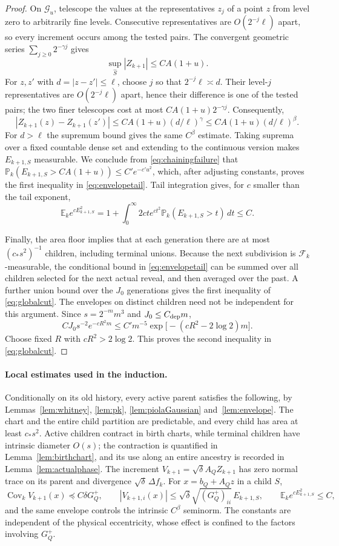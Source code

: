\documentclass[11pt]{article}
\theoremstyle{definition}
\theoremstyle{remark}
\numberwithin{equation}{section}
\newcommand{\E}{\mathbb E}
\newcommand{\Pp}{\mathbb P}
\newcommand{\F}{\mathcal F}
\begin{document}
\begin{proof}
On $\mathcal G_u$, telescope the values at the
representatives $z_j$ of a point $z$ from level zero to
arbitrarily fine levels. Consecutive representatives are
$O(2^{-j}\ell)$ apart, so every increment occurs among the
tested pairs. The convergent geometric series
$\sum_{j\ge0}2^{-\gamma j}$ gives
\[
 \sup_{\widehat S}|Z_{k+1}|\le C A(1+u).
\]
For $z,z'$ with $d=|z-z'|\le\ell$, choose $j$ so that
$2^{-j}\ell\asymp d$. Their level-$j$ representatives are
$O(2^{-j}\ell)$ apart, hence their difference is one of the
tested pairs; the two finer telescopes cost at most
$CA(1+u)2^{-\gamma j}$. Consequently,
\[
 |Z_{k+1}(z)-Z_{k+1}(z')|
 \le CA(1+u)(d/\ell)^\gamma
 \le CA(1+u)(d/\ell)^\beta.
\]
For $d>\ell$ the supremum bound gives the same
$C^\beta$ estimate. Taking suprema over a fixed countable
dense set and extending to the continuous version makes
$E_{k+1,S}$ measurable. We conclude from
\eqref{eq:chainingfailure} that
$\Pp_k(E_{k+1,S}>C A(1+u))\le C'e^{-c'u^2}$,
which, after adjusting constants, proves the first inequality
in \eqref{eq:envelopetail}. Tail integration gives, for
$c$ smaller than the tail exponent,
\[
 \E_k e^{cE_{k+1,S}^2}
 =1+\int_0^\infty 2ct e^{ct^2}
       \Pp_k(E_{k+1,S}>t)\,dt\le C.
\]

Finally, the area floor implies that at each generation there
are at most $(c_*s^2)^{-1}$ children, including terminal unions.
Because the next subdivision is $\F_k$-measurable, the
conditional bound in \eqref{eq:envelopetail} can be summed over
all children selected for the next actual reveal, and
then averaged over the past. A further union bound over the
$J_0$ generations gives the first inequality of
\eqref{eq:globalcut}. The envelopes on distinct children need not
be independent for this argument. Since $s=2^{-m}m^3$ and $J_0\le C_{\rm dep}m$,
\[
 C J_0s^{-2}e^{-cR^2m}
 \le C' m^{-5}\exp\bigl[-(cR^2-2\log2)m\bigr].
\]
Choose fixed $R$ with $cR^2>2\log2$. This proves the second
inequality in \eqref{eq:globalcut}.
\end{proof}

\paragraph{Local estimates used in the induction.}
Conditionally on its old history, every active parent satisfies the
following, by Lemmas~\ref{lem:whitney}, \ref{lem:pk},
\ref{lem:piolaGaussian} and~\ref{lem:envelope}. The chart and the
entire child partition are predictable, and every child has area at
least $c_*s^2$. Active children contract in birth charts, while
terminal children have intrinsic diameter $O(s)$; the contraction is
quantified in Lemma~\ref{lem:birthchart}, and its use along an entire
ancestry is recorded in Lemma~\ref{lem:actualphase}. The increment
$V_{k+1}=\sqrt\delta A_QZ_{k+1}$ has zero normal trace on its parent
and divergence $\sqrt\delta\,\Delta f_k$. For $x=b_Q+A_Qz$ in a
child $S$,
\[
 \operatorname{Cov}_k V_{k+1}(x)\preceq C\delta G_Q^+,
 \qquad
 |V_{k+1,i}(x)|\le
 \sqrt\delta\sqrt{(G_Q^+)_{ii}}\,E_{k+1,S},
 \qquad \E_k e^{cE_{k+1,S}^2}\le C,
\]
and the same envelope controls the intrinsic $C^\beta$ seminorm.
The constants are independent of the physical eccentricity, whose
effect is confined to the factors involving $G_Q^+$.
\end{document}
